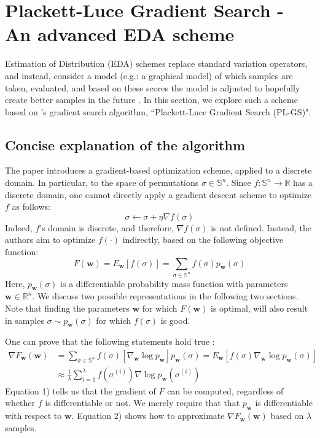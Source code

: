 \documentclass[a4paper,10pt]{article}
\begin{document}
	






\section{Plackett-Luce Gradient Search - An advanced EDA scheme} \label{cha:pl-gs}
	Estimation of Distribution (EDA) schemes replace standard variation operators, and instead, consider a model (e.g.: a graphical model) of which samples are taken, evaluated, and based on these scores the model is adjusted to hopefully create better samples in the future \cite{eiben_introduction_2015}. In this section, we explore such a scheme based on \citeauthor{santucci_gradient_2020}'s gradient search algorithm, ``Plackett-Luce Gradient Search (PL-GS)".
	
	\subsection{Concise explanation of the algorithm}
	The paper introduces a gradient-based optimization scheme, applied to a discrete domain. In particular, to the space of permutations $\sigma \in \mathbb{S}^n$. 
	Since $f : \mathbb{S}^n \rightarrow \mathbb{R}$ has a discrete domain, one cannot directly apply a gradient descent scheme to optimize $f$ as follows:
	$$
	\sigma \leftarrow \sigma + \eta \nabla f(\sigma)
	$$
	Indeed, $f$'s domain is discrete, and therefore, $\nabla f(\sigma)$ is not defined. Instead, the authors aim to optimize $f(\cdot)$ indirectly, based on the following objective function:
	$$F(\mathbf{w}) = E_\mathbf{w}[f(\sigma)] = \sum_{\sigma \in \mathbb{S}^n} f(\sigma) p_\mathbf{w}(\sigma)$$
	Here, $p_\mathbf{w}(\sigma)$ is a differentiable probability mass function with parameters $\mathbf{w} \in \mathbb{R}^n$. We discuss two possible representations in the following two sections. Note that finding the parameters $\mathbf{w}$ for which $F(\mathbf{w})$ is optimal, will also result in samples $\sigma \sim p_\mathbf{w}(\sigma)$ for which $f(\sigma)$ is good.
	
	One can prove that the following statements hold true \citep{santucci_gradient_2020}:
	\begin{align}
	\nabla F_\mathbf{w}(\mathbf{w}) & = \sum_{\sigma \in \mathbb{S}^n} f(\sigma) \left[ \nabla_\mathbf{w} \log p_\mathbf{w}\right] p_\mathbf{w}(\sigma) = E_\mathbf{w} \left[f(\sigma) \nabla_\mathbf{w} \log p_\mathbf{w}(\sigma) \right] \\
									& \approx \frac{1}{\lambda} \sum_{i=1}^{\lambda} f(\sigma^{(i)}) \nabla \log p_\mathbf{w}(\sigma^{(i)})
	\end{align}
	Equation 1) tells us that the gradient of $F$ can be computed, regardless of whether $f$ is differentiable or not. We merely require that that $p_\mathbf{w}$ is differentiable with respect to $\mathbf{w}$. Equation 2) shows how to approximate $\nabla F_\mathbf{w}(\mathbf{w})$ based on $\lambda$ samples.
	
\end{document}
